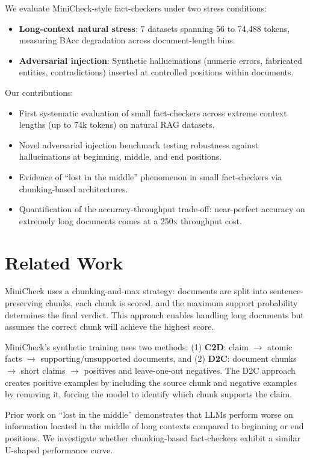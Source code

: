 \documentclass{article}
\begin{document}
We evaluate MiniCheck-style fact-checkers under two stress conditions:
\begin{itemize}
    \item \textbf{Long-context natural stress}: 7 datasets spanning 56 to 74,488 tokens, measuring BAcc degradation across document-length bins.
    \item \textbf{Adversarial injection}: Synthetic hallucinations (numeric errors, fabricated entities, contradictions) inserted at controlled positions within documents.
\end{itemize}

Our contributions:
\begin{itemize}
    \item First systematic evaluation of small fact-checkers across extreme context lengths (up to 74k tokens) on natural RAG datasets.
    \item Novel adversarial injection benchmark testing robustness against hallucinations at beginning, middle, and end positions.
    \item Evidence of ``lost in the middle'' phenomenon in small fact-checkers via chunking-based architectures.
    \item Quantification of the accuracy-throughput trade-off: near-perfect accuracy on extremely long documents comes at a 250x throughput cost.
\end{itemize}

\section{Related Work}

MiniCheck \citep{tang2024minicheck} uses a chunking-and-max strategy: documents are split into sentence-preserving chunks, each chunk is scored, and the maximum support probability determines the final verdict. This approach enables handling long documents but assumes the correct chunk will achieve the highest score.

MiniCheck's synthetic training uses two methods: (1) \textbf{C2D}: claim $\rightarrow$ atomic facts $\rightarrow$ supporting/unsupported documents, and (2) \textbf{D2C}: document chunks $\rightarrow$ short claims $\rightarrow$ positives and leave-one-out negatives. The D2C approach creates positive examples by including the source chunk and negative examples by removing it, forcing the model to identify which chunk supports the claim.

Prior work on ``lost in the middle'' \citep{laban2024lost} demonstrates that LLMs perform worse on information located in the middle of long contexts compared to beginning or end positions. We investigate whether chunking-based fact-checkers exhibit a similar U-shaped performance curve.
\end{document}
